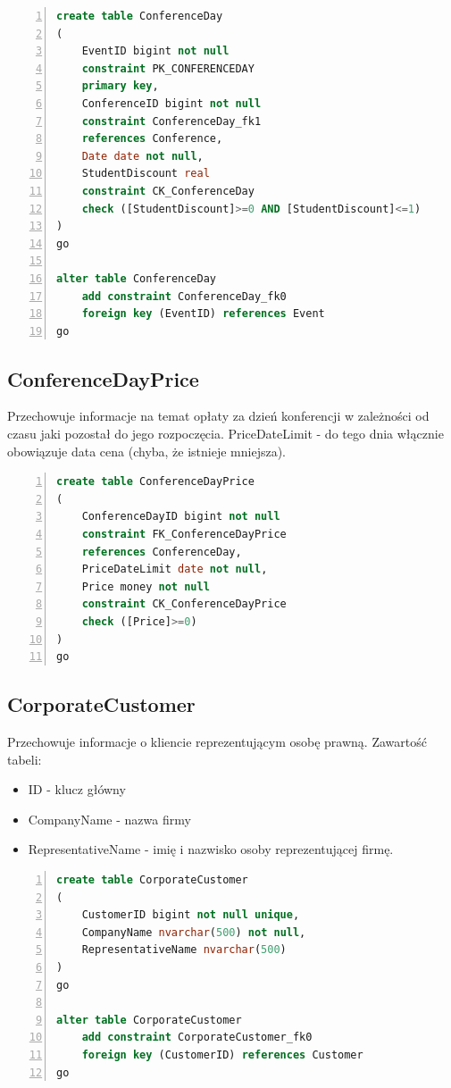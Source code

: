 \documentclass[]{article}
\begin{document}
	\begin{lstlisting}[language=SQL,
						showspaces=false,
						basicstyle=\ttfamily,
						numbers=left,
						numberstyle=\tiny,
						backgroundcolor=\color{lightg},
						keywordstyle=\color{lightblue},
						commentstyle=\color{gray}]
create table ConferenceDay
(
	EventID bigint not null
	constraint PK_CONFERENCEDAY
	primary key,
	ConferenceID bigint not null
	constraint ConferenceDay_fk1
	references Conference,
	Date date not null,
	StudentDiscount real
	constraint CK_ConferenceDay
	check ([StudentDiscount]>=0 AND [StudentDiscount]<=1)
)
go

alter table ConferenceDay
	add constraint ConferenceDay_fk0
	foreign key (EventID) references Event
go

	\end{lstlisting}
	\subsection{ConferenceDayPrice}
	Przechowuje informacje na temat opłaty za dzień konferencji w zależności od czasu jaki pozostał do jego rozpoczęcia.
	PriceDateLimit - do tego dnia włącznie obowiązuje data cena (chyba, że istnieje mniejsza).
	\begin{lstlisting}[language=SQL,
						showspaces=false,
						basicstyle=\ttfamily,
						numbers=left,
						numberstyle=\tiny,
						backgroundcolor=\color{lightg},
						keywordstyle=\color{lightblue},
						commentstyle=\color{gray}]
create table ConferenceDayPrice
(
	ConferenceDayID bigint not null
	constraint FK_ConferenceDayPrice
	references ConferenceDay,
	PriceDateLimit date not null,
	Price money not null
	constraint CK_ConferenceDayPrice
	check ([Price]>=0)
)
go
	\end{lstlisting}
	
	\subsection{CorporateCustomer}
	Przechowuje informacje o kliencie reprezentującym osobę prawną. Zawartość tabeli:
	\begin{itemize}
		\item ID - klucz główny
		\item CompanyName - nazwa firmy
		\item RepresentativeName - imię i nazwisko osoby reprezentującej firmę.
	\end{itemize}
	\begin{lstlisting}[language=SQL,
						showspaces=false,
						basicstyle=\ttfamily,
						numbers=left,
						numberstyle=\tiny,
						backgroundcolor=\color{lightg},
						keywordstyle=\color{lightblue},
						commentstyle=\color{gray}]
create table CorporateCustomer
(
	CustomerID bigint not null unique,
	CompanyName nvarchar(500) not null,
	RepresentativeName nvarchar(500)
)
go

alter table CorporateCustomer
	add constraint CorporateCustomer_fk0
	foreign key (CustomerID) references Customer
go
	\end{lstlisting}
\end{document}
